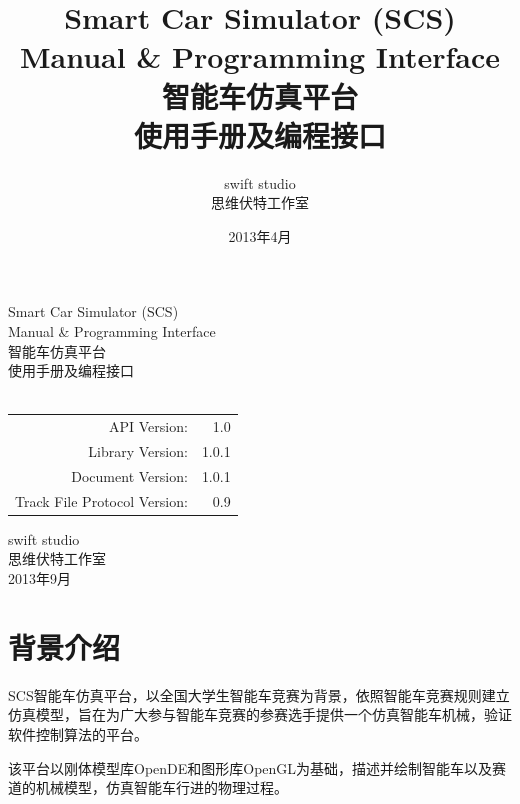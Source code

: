 \documentclass[titlepage,a4paper]{ctexart}
\begin{document}
\newcommand{\HRule}{\rule{\linewidth}{0.5mm}}
\title{Smart Car Simulator (SCS) \\ Manual \& Programming Interface \\ 智能车仿真平台 \\ 使用手册及编程接口}
\author{swift studio \\ 思维伏特工作室}
\date{2013年4月}

\begin{titlepage}

\begin{center}
\textrm{\LARGE Smart Car Simulator (SCS)}\\[0.5cm]
\textrm{\LARGE Manual \& Programming Interface}\\[0.8cm]
\textrm{\LARGE 智能车仿真平台 }\\[0.5cm]
\textrm{\LARGE 使用手册及编程接口}\\[0.5cm]
\textrm{}\\[1.5cm]
\begin{tabular}{rr}
\textrm{API Version:} & \textrm{1.0} \\
\textrm{Library Version:} & \textrm{1.0.1} \\
\textrm{Document Version:} & \textrm{1.0.1} \\
\textrm{Track File Protocol Version:} & \textrm{0.9} \\
\end{tabular}

\vfill
{\large
\textrm{swift studio \\ 思维伏特工作室} \\
2013年9月 \\[4.0cm]
}

\end{center}
\end{titlepage}

\tableofcontents
\newpage

\section{背景介绍}
SCS智能车仿真平台，以全国大学生智能车竞赛为背景，依照智能车竞赛规则建立仿真模型，旨在为广大参与智能车竞赛的参赛选手提供一个仿真智能车机械，验证软件控制算法的平台。

该平台以刚体模型库OpenDE和图形库OpenGL为基础，描述并绘制智能车以及赛道的机械模型，仿真智能车行进的物理过程。
\end{document}

